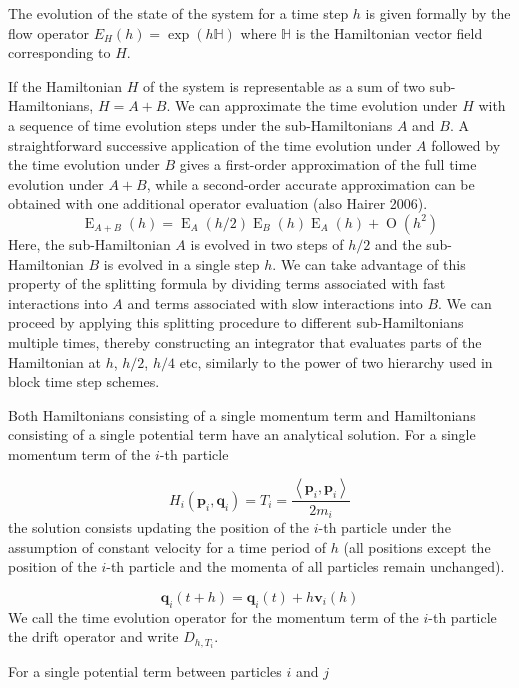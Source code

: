\documentclass[referee]{aa}
\begin{document}
The evolution of the state of the system for a time step $h$ is given formally 
by the flow operator $E_{H}(h) = \exp( h \mathbb{H})$ where $\mathbb{H}$ is the 
Hamiltonian vector field corresponding to $H$.

If the Hamiltonian $H$ of the system is representable as a sum of
two sub-Hamiltonians, $H=A+B$. We can approximate the time evolution
under $H$ with a sequence of time evolution steps under the sub-Hamiltonians
$A$ and $B$. A straightforward successive application of the time
evolution under $A$ followed by the time evolution under $B$ gives
a first-order approximation of the full time evolution under $A+B$,
while a second-order accurate approximation can be obtained with one
additional operator evaluation \cite[Sec 12.4]{SSC94} (also Hairer 2006).
\begin{equation}
\operatorname{E}_{A+B}(h)=\operatorname{E}_{A}(h/2)\operatorname{E}_{B}(h)\operatorname{E}_{A}(h)+\operatorname{O}\left(h^{2}\right)\label{eq:second-order-kick}
\end{equation}
Here, the sub-Hamiltonian $A$ is evolved in two steps of $h/2$ and
the sub-Hamiltonian $B$ is evolved in a single step $h$. We can
take advantage of this property of the splitting formula by dividing
terms associated with fast interactions into $A$ and terms associated
with slow interactions into $B$. We can proceed by applying this
splitting procedure to different sub-Hamiltonians multiple times,
thereby constructing an integrator that evaluates parts of the Hamiltonian
at $h$, $h/2$, $h/4$ etc, similarly to the power of two hierarchy
used in block time step schemes.

Both Hamiltonians consisting of a single momentum term and Hamiltonians
consisting of a single potential term have an analytical solution.
For a single momentum term of the $i$-th particle

\[
H_{i}(\mathbf{p}_{i},\mathbf{q}_{i})=T_{i}=\frac{\left\langle \mathbf{p}_{i},\mathbf{p}_{i}\right\rangle }{2m_{i}}
\]
the solution consists updating the position of the $i$-th particle
under the assumption of constant velocity for a time period of $h$
(all positions except the position of the $i$-th particle and the
momenta of all particles remain unchanged). 

\[
\mathbf{q}_{i}(t+h)=\mathbf{q}_{i}(t)+h\mathbf{v}_{i}(h)
\]
We call the time evolution operator for the momentum term of the $i$-th
particle the drift operator and write $D_{h,T_{i}}$.

For a single potential term between particles $i$ and $j$
\end{document}
